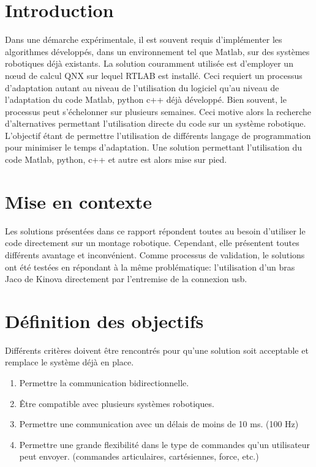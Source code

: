 \section{Introduction}
Dans une démarche expérimentale, il est souvent requis d'implémenter les algorithmes développés, dans un environnement tel que Matlab, sur des systèmes robotiques déjà existants. 
La solution couramment utilisée est d'employer un nœud de calcul QNX sur lequel RTLAB est installé. 
Ceci requiert un processus d'adaptation autant au niveau de l'utilisation du logiciel qu'au niveau de l'adaptation du code Matlab, python c++ déjà développé. 
Bien souvent, le processus peut s'échelonner sur plusieurs semaines. 
Ceci motive alors la recherche d'alternatives permettant l'utilisation directe du code sur un système robotique. 
L'objectif étant de permettre l'utilisation de différents langage de programmation pour minimiser le temps d'adaptation. 
Une solution permettant l'utilisation du code Matlab, python, c++ et autre est alors mise sur pied.

\section{Mise en contexte}

Les solutions présentées dans ce rapport répondent toutes au besoin d'utiliser le code directement sur un montage robotique. 
Cependant, elle présentent toutes différents avantage et inconvénient. 
Comme processus de validation, le solutions ont été testées en répondant à la même problématique: l'utilisation d'un bras Jaco de Kinova directement par l'entremise de la connexion usb.


\section{Définition des objectifs}

Différents critères doivent être rencontrés pour qu'une solution soit acceptable et remplace le système déjà en place.

\begin{enumerate}
\item Permettre la communication bidirectionnelle.
\item Être compatible avec plusieurs systèmes robotiques.
\item Permettre une communication avec un délais de moins de 10 ms. (100 Hz)
\item Permettre une grande flexibilité dans le type de commandes qu'un utilisateur peut envoyer. (commandes articulaires, cartésiennes, force, etc.)
\end{enumerate}

